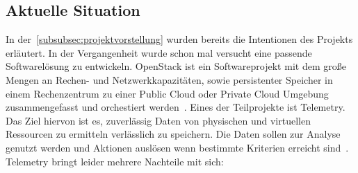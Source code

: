 \subsection{Aktuelle Situation}
In der~\ref{subsubsec:projektvorstellung} wurden bereits die Intentionen des
Projekts erläutert. In der Vergangenheit wurde schon mal versucht eine passende
Softwarelösung zu entwickeln. OpenStack ist ein Softwareprojekt mit dem große
Mengen an Rechen- und Netzwerkkapazitäten, sowie persistenter Speicher in einem
Rechenzentrum zu einer \gls{Public Cloud} oder \gls{Private Cloud} Umgebung
zusammengefasst und orchestiert werden~\cite{OpenStack_Intro}. Eines der
Teilprojekte ist Telemetry. Das Ziel hiervon ist es, zuverlässig Daten von
physischen und virtuellen Ressourcen zu ermitteln verlässlich zu speichern. Die
Daten sollen zur Analyse genutzt werden und Aktionen auslösen wenn bestimmte
Kriterien erreicht sind~\cite{OpenStack_Telemetry}. Telemetry bringt leider
mehrere Nachteile mit sich:

